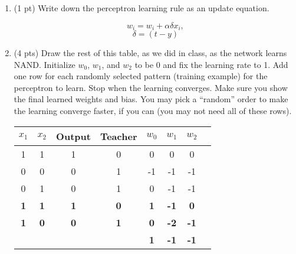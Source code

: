 \begin{enumerate}[label=(\alph*)]

	\item (1 pt) Write down the perceptron learning rule as an update equation.

	      \begin{tcolorbox}[title={Solution}]
		      $$ w_i = w_i + \alpha \delta x_i, $$
		      $$\delta = \left( t - y \right) $$
	      \end{tcolorbox}

	\item (4 pts)
	      Draw the rest of this table, as we did in class, as the network learns NAND. Initialize $w_0$, $w_{1}$, and $w_{2}$ to be 0 and fix the learning
	      rate to 1. Add one row for each randomly selected pattern
	      (training example) for the perceptron to learn. Stop when the learning
	      converges. Make sure you show the final learned weights and bias. You may pick a ``random'' order to make the learning converge faster, if you can (you may not need all of these rows).

	      \begin{tcolorbox}[title={Solution}]

		      \begin{center}
			      \begin{tabular}{|c|c|c|c|c|c|c|c|}

				      \hline
				      $x_{1}$    & $x_{2}$    & Output     & Teacher    & $w_0$      & $w_{1}$     & $w_{2}$     \\
				      \hline
				      1          & 1          & 1          & 0          & 0          & 0           & 0           \\
				      \hline
				      0          & 0          & 0          & 1          & -1         & -1          & -1          \\
				      \hline
				      0          & 1          & 0          & 1          & 0          & -1          & -1          \\
				      \hline
				      \textbf{1} & \textbf{1} & \textbf{1} & \textbf{0} & \textbf{1} & \textbf{-1} &
				      \textbf{0}                                                                                 \\
				      \hline

				      \textbf{1} & \textbf{0} & \textbf{0} & \textbf{1} & \textbf{0} & \textbf{-2} &
				      \textbf{-1}                                                                                \\
				      \hline
				                 &            &            &            & \textbf{1} & \textbf{-1} & \textbf{-1} \\
				      \hline
			      \end{tabular}
		      \end{center}


\end{tcolorbox}
\end{enumerate}
